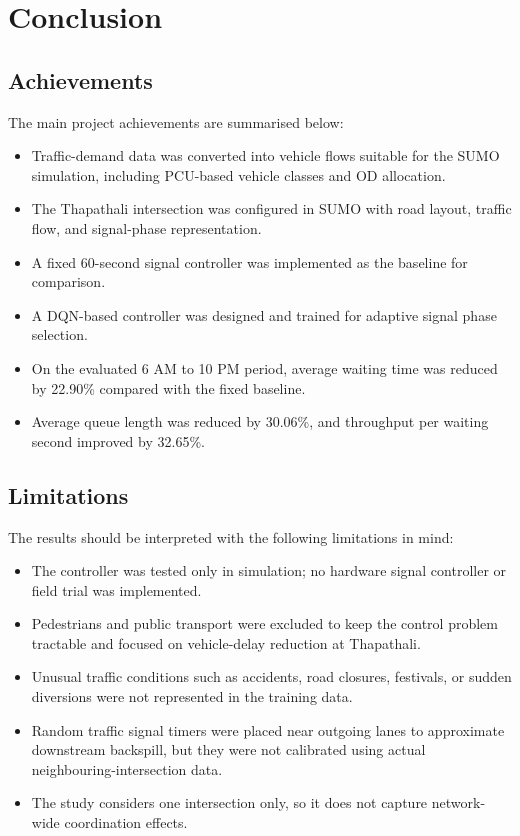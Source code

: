 \chapter{Conclusion}
\label{chap:conclusion}

\section{Achievements}
\label{sec:achievements}

The main project achievements are summarised below:

\begin{itemize}
  \item Traffic-demand data was converted into vehicle flows suitable for the SUMO simulation, including PCU-based vehicle classes and OD allocation.
  \item The Thapathali intersection was configured in SUMO with road layout, traffic flow, and signal-phase representation.
  \item A fixed 60-second signal controller was implemented as the baseline for comparison.
  \item A DQN-based controller was designed and trained for adaptive signal phase selection.
  \item On the evaluated 6 AM to 10 PM period, average waiting time was reduced by 22.90\% compared with the fixed baseline.
  \item Average queue length was reduced by 30.06\%, and throughput per waiting second improved by 32.65\%.
\end{itemize}

\section{Limitations}
\label{sec:limitations}

The results should be interpreted with the following limitations in mind:

\begin{itemize}
  \item The controller was tested only in simulation; no hardware signal controller or field trial was implemented.
  \item Pedestrians and public transport were excluded to keep the control problem tractable and focused on vehicle-delay reduction at Thapathali.
  \item Unusual traffic conditions such as accidents, road closures, festivals, or sudden diversions were not represented in the training data.
  \item Random traffic signal timers were placed near outgoing lanes to approximate downstream backspill, but they were not calibrated using actual neighbouring-intersection data.
  \item The study considers one intersection only, so it does not capture network-wide coordination effects.
\end{itemize}

